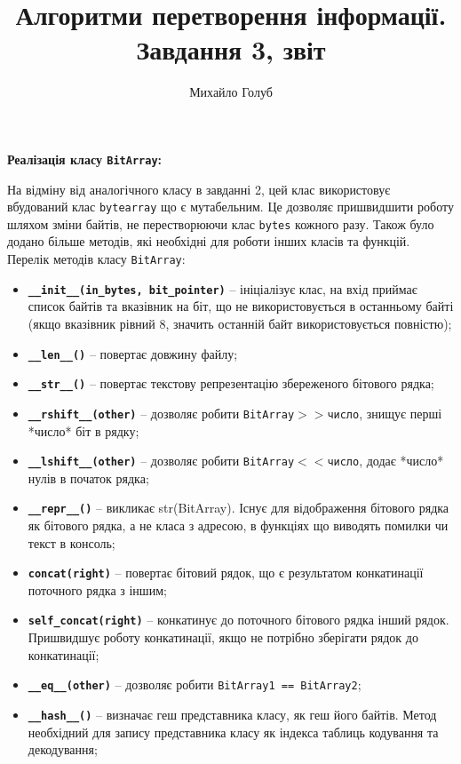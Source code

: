 \documentclass{article}
\title{Алгоритми перетворення інформації. Завдання 3, звіт}
\author{Михайло Голуб}
\def\code#1{\texttt{#1}}
\begin{document}
\maketitle
\newpage

\textbf{Реалізація класу \code{BitArray}:}\\\indent

На відміну від аналогічного класу в завданні 2, цей клас використовує вбудований клас \code{bytearray} що є мутабельним. 
Це дозволяє пришвидшити роботу шляхом зміни байтів, не перестворюючи клас \code{bytes} кожного разу. 
Також було додано більше методів, які необхідні для роботи інших класів та функцій.\\\indent
Перелік методів класу \code{BitArray}:
\begin{itemize}
    \item \textbf{\code{\_\_init\_\_(in\_bytes, bit\_pointer)}} -- ініціалізує клас, на вхід приймає список байтів та вказівник на біт, що не використовується в останньому байті (якщо вказівник рівний 8, значить останній байт використовується повністю);
    \item \textbf{\code{\_\_len\_\_()}} -- повертає довжину файлу;
    \item \textbf{\code{\_\_str\_\_()}} -- повертає текстову репрезентацію збереженого бітового рядка;
    \item \textbf{\code{\_\_rshift\_\_(other)}} -- дозволяє робити \code{BitArray$>>$число}, знищує перші *число* біт в рядку;
    \item \textbf{\code{\_\_lshift\_\_(other)}} -- дозволяє робити \code{BitArray$<<$число}, додає *число* нулів в початок рядка;
    \item \textbf{\code{\_\_repr\_\_()}} -- викликає str(BitArray). Існує для відображення бітового рядка як бітового рядка, а не класа з адресою, в функціях що виводять помилки чи текст в консоль;
    \item \textbf{\code{concat(right)}} -- повертає бітовий рядок, що є результатом конкатинації поточного рядка з іншим;
    \item \textbf{\code{self\_concat(right)}} -- конкатинує до поточного бітового рядка інший рядок. Пришвидшує роботу конкатинації, якщо не потрібно зберігати рядок до конкатинації;
    \item \textbf{\code{\_\_eq\_\_(other)}} -- дозволяє робити \code{BitArray1 == BitArray2};
    \item \textbf{\code{\_\_hash\_\_()}} -- визначає геш представника класу, як геш його байтів. Метод необхідний для запису представника класу як індекса таблиць кодування та декодування;

\end{itemize}
\end{document}

